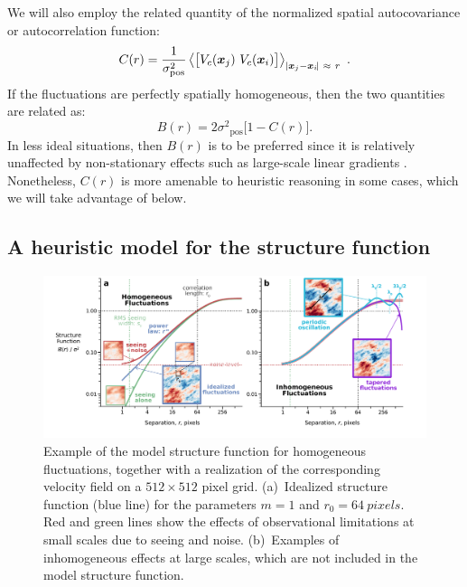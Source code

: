 \documentclass[fleqn,usenatbib, useAMS, a4paper]{mnras}
\newcommand\pos{\ensuremath{_{\mathrm{pos}}}}
\begin{document}
We will also employ the related quantity of the
normalized spatial autocovariance or autocorrelation function:
\begin{equation}
  \label{eq:autocovar}
  C(r) = \frac{1}{\sigma^2\pos}\left\langle 
  \bigl[
  V_{c}(\xx_j) \  V_{c}(\xx_i)
  \bigr] \right \rangle_{\Abs{\xx_j - \xx_i\!} \ \approx \ r} \ .
\end{equation}
If the fluctuations are perfectly spatially homogeneous, then the
two quantities are related \citep{1984ApJ...277..556S} as:
\begin{equation}\label{eq:functional}
  B(r) = 2\sigma^2\pos \bigl[   1 - C(r)\bigr] .
\end{equation}
In less ideal situations, then \(B(r)\) is to be preferred since it is
relatively unaffected by non-stationary effects
such as large-scale linear gradients 
\citep{1984ApJ...277..556S}.
Nonetheless, \(C(r)\) is more amenable to heuristic reasoning in some cases,
which we will take advantage of below.


\subsection{A heuristic model for the structure function}
\label{sec:methods-apply}

\begin{figure}
 \centering
 \includegraphics[width=\linewidth]{Figures/model-strucfunc-annotated}\par
 \caption{
   Example of the model structure function for homogeneous fluctuations,
   together with a realization of the corresponding velocity field
   on a \(512 \times 512\) pixel grid.  
   (a)~Idealized structure function (blue line)
   for the parameters \(m = 1\) and \(r_0 = \SI{64}{pixels}\).
   Red and green lines show the effects of observational limitations
   at small scales due to seeing and noise.
   (b)~Examples of inhomogeneous effects at large scales,
   which are not included in the model structure function.
 }
 \label{fig:model-strucfunc}
\end{figure}
\end{document}
